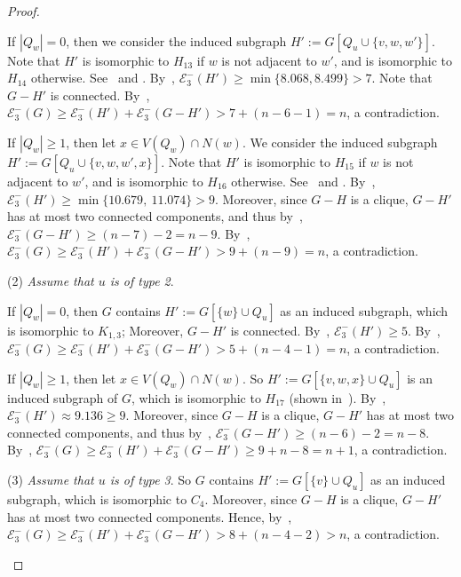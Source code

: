 \documentclass[a4paper,12pt]{article}
\theoremstyle{plain}
\newenvironment{proof*}{\noindent \emph{Proof of the claim.}}{\hfill$\Diamond$}
\begin{document}
\begin{proof}
\begin{proof*}
If $|Q_w|=0$, then we consider the induced subgraph $H':=G[Q_u\cup \{v,w,w'\}]$. Note that $H'$ is isomorphic to $H_{13}$ if $w$ is not adjacent to $w'$, and is isomorphic to $H_{14}$ otherwise. See~ and . By~, $\mathcal{E}_3^{-}(H')\geq \min\{8.068, 8.499\}>7$. Note that $G-H'$ is connected. By~, $\mathcal{E}_3^{-}(G)\geq\mathcal{E}_3^{-}(H')+\mathcal{E}_3^{-}(G-H')> 7+(n-6-1)=n$, a contradiction.    


If $|Q_w|\geq 1$, then let $x\in V(Q_w)\cap N(w)$. We consider the induced subgraph $H':=G[Q_u\cup \{v,w,w',x\}]$. Note that $H'$ is isomorphic to $H_{15}$ if $w$ is not adjacent to $w'$, and is isomorphic to $H_{16}$ otherwise. See~ and . 
By~, $\mathcal{E}_3^{-}(H')\geq \min \{10.679,~11.074\}>9$. Moreover, since $G-H$ is a clique, $G-H'$ has at most two connected components, and thus by~, $\mathcal{E}_3^{-}(G-H')\geq (n-7)-2=n-9$. By~, $\mathcal{E}_3^{-}(G)\geq\mathcal{E}_3^{-}(H')+\mathcal{E}_3^{-}(G-H')> 9+(n-9)=n$, a contradiction.  

\medskip
\noindent
(2) \emph{Assume that $u$ is of type 2}.

If $|Q_w|=0$, then $G$ contains $H':=G[\{w\}\cup Q_u]$ as an induced subgraph, which is isomorphic to $K_{1,3}$; Moreover, $G-H'$ is connected.  By~, $\mathcal{E}_3^{-}(H')\geq 5$. By~, $\mathcal{E}_3^{-}(G)\geq\mathcal{E}_3^{-}(H')+\mathcal{E}_3^{-}(G-H')> 5+(n-4-1)=n$, a contradiction.
       
If $|Q_w|\geq 1$, then let $x\in V(Q_w)\cap N(w)$. So $H':=G[\{v,w,x\}\cup Q_u]$ is an induced subgraph of $G$, which is isomorphic to $H_{17}$ (shown in~). By~, $\mathcal{E}_3^{-}(H')\approx 9.136\geq 9$. Moreover, since $G-H$ is a clique, $G-H'$ has at most two connected components, and thus by~, $\mathcal{E}_3^{-}(G-H')\geq (n-6)-2=n-8$. By~, $\mathcal{E}_3^{-}(G)\geq\mathcal{E}_3^{-}(H')+\mathcal{E}_3^{-}(G-H')\geq 9+n-8=n+1$, a contradiction. 

\medskip
\noindent
(3) \emph{Assume that $u$ is of type 3}. So $G$ contains $H':=G[\{v\}\cup Q_u]$ as an induced subgraph, which is isomorphic to $C_4$. Moreover, since $G-H$ is a clique, $G-H'$ has at most two connected components. Hence, by~, $\mathcal{E}_3^{-}(G)\geq\mathcal{E}_3^{-}(H')+\mathcal{E}_3^{-}(G-H')> 8+(n-4-2)>n$, a contradiction. 
\end{proof*}


\end{proof}
\end{document}
